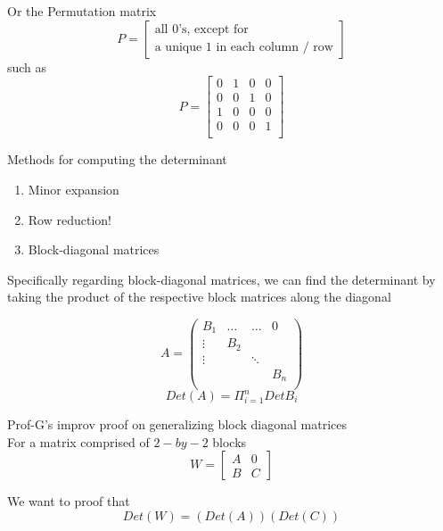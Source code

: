 Or the Permutation matrix \[
  P = \begin{bmatrix}  
     \text{all $0$'s, except for} \\
     \text{a unique $1$ in each column / row}
  \end{bmatrix}
\] such as \[
  P = \begin{bmatrix} 
     0 & 1 & 0 & 0 \\  
     0 & 0 & 1 & 0 \\  
     1 & 0 & 0 & 0 \\  
     0 & 0 & 0 & 1 \\  
  \end{bmatrix}
\] 

Methods for computing the determinant 
\begin{enumerate}
   \item Minor expansion
   \item Row reduction!
   \item Block-diagonal matrices
\end{enumerate}

Specifically regarding block-diagonal matrices, we can find the determinant by taking the product of the respective block matrices along the diagonal

\begin{framed}

   \[
     A = \begin{pmatrix} 
        B_1    & \hdots & \hdots & 0 \\  
         \vdots&   B_2  &        &  \\  
         \vdots&        &\ddots  &  \\  
               &        &        &  B_n  \\  
     \end{pmatrix}
   \] 
   \[
      Det (A) = \Pi_{i=1}^{n} Det B_i
   \] 
  
\end{framed}

Prof-G's improv proof on generalizing block diagonal matrices \\

For a matrix comprised of $2-by-2$ blocks \[ W =
   \left[
      \begin{array}{c|c}
         A & 0 \\
         \hline
         B & C 
     \end{array}
   \right]
\] 

We want to proof that \[
  Det (W) = (Det (A) ) (Det (C))
\] 

